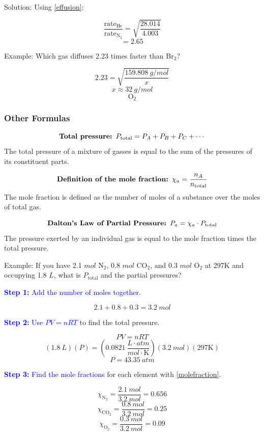 \documentclass[a4paper, 12pt]{article}
\newcommand{\R}{\left(0.0821 \: \frac{L \cdot atm}{mol \cdot \text{K}}\right)}
\begin{document}
Solution: Using \ref{effusion}:

$$\frac{\text{rate}_\text{He}}{\text{rate}_\text{N$_2$}} = \sqrt{\frac{28.014}{4.003}}$$
$$=\boxed{2.65}$$

Example: Which gas diffuses 2.23 times faster than Br$_2$?

$$2.23 = \sqrt{\frac{159.808 \: g/mol}{x}}$$
$$x \approx 32 \: g/mol$$
$$\boxed{\text{O}_2}$$

\subsubsection{Other Formulas}

\begin{equation}\label{totalpressure}
    \text{\textbf{Total pressure: }} P_{\text{total}} = P_A + P_B + P_C + \cdots
\end{equation}
The total pressure of a mixture of gasses is equal to the sum of the pressures of its constituent parts.

\begin{equation}\label{molefraction}
    \text{\textbf{Definition of the mole fraction: }} \chi_a = \frac{n_A}{n_\text{total}}
\end{equation}
The mole fraction is defined as the number of moles of a substance over the moles of total gas.

\begin{equation}\label{partialpressure}
    \text{\textbf{Dalton's Law of Partial Pressure: }} P_a = \chi_a \cdot P_{\text{total}} 
\end{equation}
The pressure exerted by an individual gas is equal to the mole fraction times the total pressure.

Example: If you have 2.1 $mol$ N$_2$, 0.8 $mol$ CO$_2$, and 0.3 $mol$ O$_2$ at 297K and occupying 1.8 $L$, what is $P_{\text{total}}$ and the partial pressures?

\textcolor{blue}{\textbf{Step 1:} Add the number of moles together.}

$$2.1 + 0.8 + 0.3 = 3.2 \: mol$$

\textcolor{blue}{\textbf{Step 2:} Use $PV = nRT$} to find the total pressure.

$$PV = nRT$$
$$(1.8 \: L)(P) = \R (3.2 \: mol)(297\text{K})$$
$$P = 43.35 \: atm$$

\textcolor{blue}{\textbf{Step 3:} Find the mole fractions} for each element with \ref{molefraction}.

$$\chi_{\text{N}_2} = \frac{2.1 \: mol}{3.2 \: mol} = 0.656$$
$$\chi_{\text{CO}_2} = \frac{0.8 \: mol}{3.2 \: mol} = 0.25$$
$$\chi_{\text{O}_2} = \frac{0.3 \: mol}{3.2 \: mol} = 0.09$$
\end{document}
